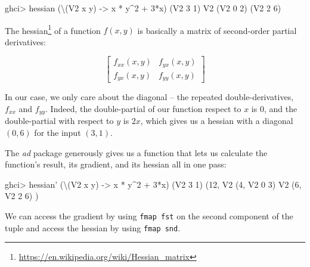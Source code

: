 \documentclass[]{article}
\newenvironment{Shaded}{}{}
\newcommand{\DataTypeTok}[1]{\textcolor[rgb]{0.56,0.13,0.00}{{#1}}}
\newcommand{\DecValTok}[1]{\textcolor[rgb]{0.25,0.63,0.44}{{#1}}}
\newcommand{\OtherTok}[1]{\textcolor[rgb]{0.00,0.44,0.13}{{#1}}}
\newcommand{\FunctionTok}[1]{\textcolor[rgb]{0.02,0.16,0.49}{{#1}}}
\newcommand{\NormalTok}[1]{{#1}}
\renewcommand{\href}[2]{#2\footnote{\url{#1}}}
\begin{document}
\begin{Shaded}
\begin{Highlighting}[]
\NormalTok{ghci}\FunctionTok{>} \NormalTok{hessian (\textbackslash{}(}\DataTypeTok{V2} \NormalTok{x y) }\OtherTok{->} \NormalTok{x }\FunctionTok{*} \NormalTok{y}\FunctionTok{^}\DecValTok{2} \FunctionTok{+} \DecValTok{3}\FunctionTok{*}\NormalTok{x) (}\DataTypeTok{V2} \DecValTok{3} \DecValTok{1}\NormalTok{)}
\DataTypeTok{V2} \NormalTok{(}\DataTypeTok{V2} \DecValTok{0} \DecValTok{2}\NormalTok{)}
   \NormalTok{(}\DataTypeTok{V2} \DecValTok{2} \DecValTok{6}\NormalTok{)}
\end{Highlighting}
\end{Shaded}

The \href{https://en.wikipedia.org/wiki/Hessian_matrix}{hessian} of a
function \(f(x,y)\) is basically a matrix of second-order partial
derivatives:

\[
\begin{bmatrix}
f_{xx}(x, y) & f_{yx}(x, y) \\
f_{yx}(x, y) & f_{yy}(x, y)
\end{bmatrix}
\]

In our case, we only care about the diagonal -- the repeated
double-derivatives, \(f_{xx}\) and \(f_{yy}\). Indeed, the
double-partial of our function respect to \(x\) is \(0\), and the
double-partial with respect to \(y\) is \(2x\), which gives us a hessian
with a diagonal \((0, 6)\) for the input \((3, 1)\).

The \emph{ad} package generously gives us a function that lets us
calculate the function's result, its gradient, and its hessian all in
one pass:

\begin{Shaded}
\begin{Highlighting}[]
\NormalTok{ghci}\FunctionTok{>} \NormalTok{hessian' (\textbackslash{}(}\DataTypeTok{V2} \NormalTok{x y) }\OtherTok{->} \NormalTok{x }\FunctionTok{*} \NormalTok{y}\FunctionTok{^}\DecValTok{2} \FunctionTok{+} \DecValTok{3}\FunctionTok{*}\NormalTok{x) (}\DataTypeTok{V2} \DecValTok{3} \DecValTok{1}\NormalTok{)}
\NormalTok{(}\DecValTok{12}\NormalTok{, }\DataTypeTok{V2} \NormalTok{(}\DecValTok{4}\NormalTok{, }\DataTypeTok{V2} \DecValTok{0} \DecValTok{3}\NormalTok{)}
     \DataTypeTok{V2} \NormalTok{(}\DecValTok{6}\NormalTok{, }\DataTypeTok{V2} \DecValTok{2} \DecValTok{6}\NormalTok{)}
\NormalTok{)}
\end{Highlighting}
\end{Shaded}

We can access the gradient by using \texttt{fmap\ fst} on the second
component of the tuple and access the hessian by using
\texttt{fmap\ snd}.
\end{document}
